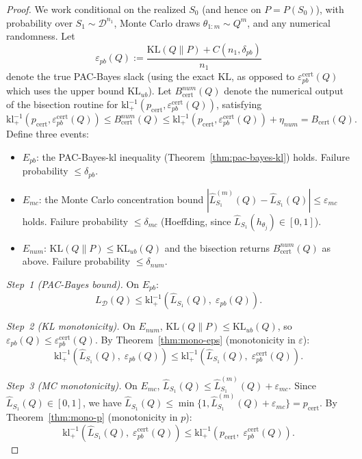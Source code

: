 \documentclass[11pt,a4paper]{article}
\newcommand{\kl}{\mathrm{kl}}
\newcommand{\KL}{\mathrm{KL}}
\newcommand{\cD}{\mathcal{D}}
\newcommand{\klinv}{\kl^{-1}_+}
\begin{document}
\begin{proof}
We work conditional on the realized $S_0$ (and hence on $P = P(S_0)$), with probability over $S_1 \sim \cD^{n_1}$, Monte Carlo draws $\theta_{1:m} \sim Q^m$, and any numerical randomness. Let
\[
\varepsilon_{pb}(Q) := \frac{\KL(Q\|P) + C(n_1,\delta_{pb})}{n_1}
\]
denote the true PAC-Bayes slack (using the exact $\KL$, as opposed to $\varepsilon_{pb}^{\mathrm{cert}}(Q)$ which uses the upper bound $\KL_{ub}$). Let $B_{\mathrm{cert}}^{num}(Q)$ denote the numerical output of the bisection routine for $\klinv(p_{\mathrm{cert}}, \varepsilon_{pb}^{\mathrm{cert}}(Q))$, satisfying
\[
\klinv(p_{\mathrm{cert}}, \varepsilon_{pb}^{\mathrm{cert}}(Q)) \le B_{\mathrm{cert}}^{num}(Q) \le \klinv(p_{\mathrm{cert}}, \varepsilon_{pb}^{\mathrm{cert}}(Q)) + \eta_{num} = B_{\mathrm{cert}}(Q).
\]
Define three events:
\begin{itemize}
    \item $E_{pb}$: the PAC-Bayes-kl inequality (Theorem~\ref{thm:pac-bayes-kl}) holds. Failure probability $\le \delta_{pb}$.
    \item $E_{mc}$: the Monte Carlo concentration bound $|\hat{L}_{S_1}^{(m)}(Q) - \hat{L}_{S_1}(Q)| \le \varepsilon_{mc}$ holds. Failure probability $\le \delta_{mc}$ (Hoeffding, since $\hat{L}_{S_1}(h_{\theta_j}) \in [0,1]$).
    \item $E_{num}$: $\KL(Q\|P) \le \KL_{ub}(Q)$ and the bisection returns $B_{\mathrm{cert}}^{num}(Q)$ as above. Failure probability $\le \delta_{num}$.
\end{itemize}

\emph{Step~1 (PAC-Bayes bound).} On $E_{pb}$:
\[
L_\cD(Q) \le \klinv\!\left(\hat{L}_{S_1}(Q),\; \varepsilon_{pb}(Q)\right).
\]

\emph{Step~2 (KL monotonicity).} On $E_{num}$, $\KL(Q\|P) \le \KL_{ub}(Q)$, so $\varepsilon_{pb}(Q) \le \varepsilon_{pb}^{\mathrm{cert}}(Q)$. By Theorem~\ref{thm:mono-eps} (monotonicity in $\varepsilon$):
\[
\klinv\!\left(\hat{L}_{S_1}(Q),\; \varepsilon_{pb}(Q)\right) \le \klinv\!\left(\hat{L}_{S_1}(Q),\; \varepsilon_{pb}^{\mathrm{cert}}(Q)\right).
\]

\emph{Step~3 (MC monotonicity).} On $E_{mc}$, $\hat{L}_{S_1}(Q) \le \hat{L}_{S_1}^{(m)}(Q) + \varepsilon_{mc}$. Since $\hat{L}_{S_1}(Q) \in [0,1]$, we have $\hat{L}_{S_1}(Q) \le \min\{1, \hat{L}_{S_1}^{(m)}(Q) + \varepsilon_{mc}\} = p_{\mathrm{cert}}$. By Theorem~\ref{thm:mono-p} (monotonicity in $p$):
\[
\klinv\!\left(\hat{L}_{S_1}(Q),\; \varepsilon_{pb}^{\mathrm{cert}}(Q)\right) \le \klinv\!\left(p_{\mathrm{cert}},\; \varepsilon_{pb}^{\mathrm{cert}}(Q)\right).
\]


\end{proof}
\end{document}
